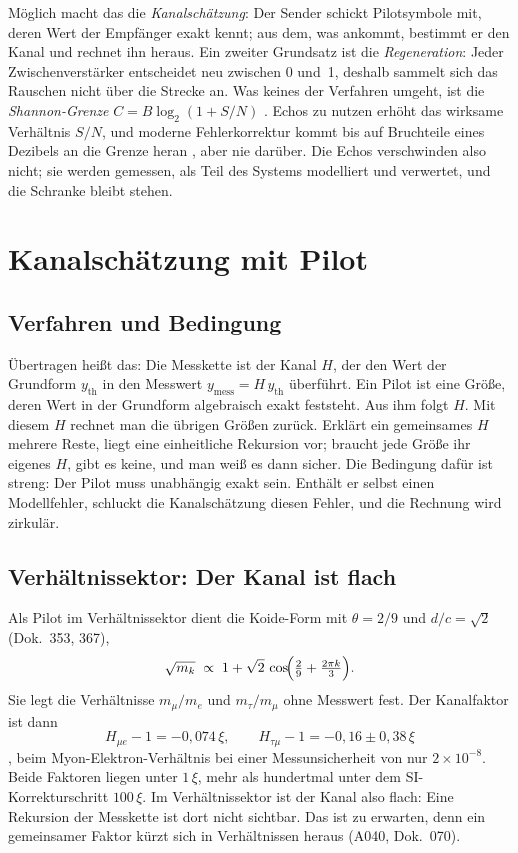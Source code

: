 Möglich macht das die \emph{Kanalschätzung}: Der Sender schickt Pilotsymbole mit, deren Wert der
Empfänger exakt kennt; aus dem, was ankommt, bestimmt er den Kanal und rechnet ihn heraus. Ein
zweiter Grundsatz ist die \emph{Regeneration}: Jeder Zwischenverstärker entscheidet neu zwischen 0
und~1, deshalb sammelt sich das Rauschen nicht über die Strecke an. Was keines der Verfahren
umgeht, ist die \emph{Shannon-Grenze} $C=B\log_2(1+S/N)$ \cite{Shannon1948}. Echos zu nutzen erhöht das
wirksame Verhältnis $S/N$, und moderne Fehlerkorrektur kommt bis auf Bruchteile eines Dezibels an die
Grenze heran \cite{Berrou1993,Arikan2009}, aber nie darüber. Die Echos verschwinden also nicht; sie
werden gemessen, als Teil des Systems modelliert und verwertet, und die Schranke bleibt stehen.

\section{Kanalschätzung mit Pilot}

\subsection{Verfahren und Bedingung}

Übertragen heißt das: Die Messkette ist der Kanal $H$, der den Wert der Grundform $y_{\text{th}}$ in den
Messwert $y_{\text{mess}}=H\,y_{\text{th}}$ überführt. Ein Pilot ist eine Größe, deren Wert in der
Grundform algebraisch exakt feststeht. Aus ihm folgt $H$. Mit diesem $H$ rechnet man die übrigen
Größen zurück. Erklärt ein gemeinsames $H$ mehrere Reste, liegt eine einheitliche Rekursion vor;
braucht jede Größe ihr eigenes $H$, gibt es keine, und man weiß es dann sicher. Die Bedingung dafür
ist streng: Der Pilot muss unabhängig exakt sein. Enthält er selbst einen Modellfehler, schluckt die
Kanalschätzung diesen Fehler, und die Rechnung wird zirkulär.

\subsection{Verhältnissektor: Der Kanal ist flach}

Als Pilot im Verhältnissektor dient die Koide-Form mit $\theta=2/9$ und $d/c=\sqrt2$ (Dok.~353, 367),
\begin{equation}
  \sqrt{m_k}\;\propto\;1+\sqrt2\,\cos\!\Bigl(\tfrac29+\tfrac{2\pi k}{3}\Bigr).
\end{equation}
Sie legt die Verhältnisse $m_\mu/m_e$ und $m_\tau/m_\mu$ ohne Messwert fest. Der Kanalfaktor ist
dann
\begin{equation}
  H_{\mu e}-1=-0{,}074\,\xi,\qquad H_{\tau\mu}-1=-0{,}16\pm0{,}38\,\xi
\end{equation}
\KM, beim Myon-Elektron-Verhältnis bei einer Messunsicherheit von nur $2\times10^{-8}$. Beide Faktoren
liegen unter $1\,\xi$, mehr als hundertmal unter dem SI-Korrekturschritt $100\,\xi$. Im
Verhältnissektor ist der Kanal also flach: Eine Rekursion der Messkette ist dort nicht sichtbar. Das
ist zu erwarten, denn ein gemeinsamer Faktor kürzt sich in Verhältnissen heraus (A040, Dok.~070).

